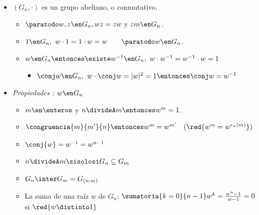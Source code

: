 \begin{itemize}[label=\color{gray} \tiny {}]
  \item $(G_n, \cdot)$ es un grupo abeliano, o conmutativo.
        \begin{itemize}
          \item $\paratodo w, z \en G_n, w z = z  w \text{ y } z m \en G_n$.

          \item $1 \en G_n,\ w \cdot 1 = 1 \cdot w = w \qquad \paratodo w \en G_n$.

          \item $w \en G_n \entonces \existe w^{-1} \en G_n,\ w \cdot w^{-1} = w^{-1} \cdot w = 1$
                \begin{itemize}
                  \item $\conj w \en G_n,\ w \cdot \conj w = |w|^2 = 1 \entonces \conj w = w^{-1}$
                \end{itemize}
        \end{itemize}

  \item \hypertarget{teoria6:propiedadesGn}{\textit{Propiedades : $w \en G_n$}}

        \begin{itemize}
          \item $m \en \enteros$ y $n \divideA m \entonces w^m = 1$.

          \item $\congruencia{m}{m'}{n} \entonces w^m = w^{m'} \quad (\red{w^m = w^{r_n(m)}})$

          \item $\conj{w} = w^{-1} = w^{n-1}$

          \item $n \divideA m \sisolosi G_n \subseteq G_m$

          \item $G_n \inter G_m = G_{(n:m)}$

          \item La suma de una raíz $w$ de $G_n$:
                $\sumatoria{k=0}{n-1} w^k = \frac{w^n -1}{w -1} = 0$
                si
                $\red{w \distinto 1}$
        \end{itemize}

\end{itemize}
